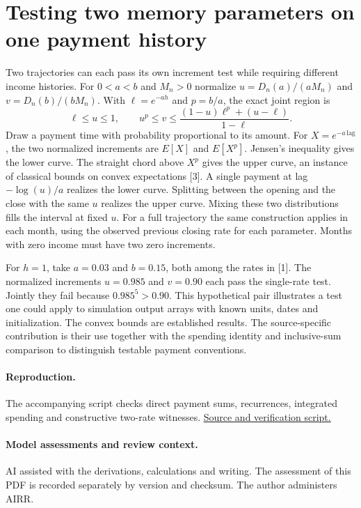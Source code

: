 \documentclass[11pt]{article}
\begin{document}
\section{Testing two memory parameters on one payment history}
Two trajectories can each pass its own increment test while requiring different income histories. For $0<a<b$ and $M_n>0$ normalize $u=D_n(a)/(aM_n)$ and $v=D_n(b)/(bM_n)$. With $\ell=e^{-ah}$ and $p=b/a$, the exact joint region is
\[
 \ell\le u\le1,\qquad u^p\le v\le
 \frac{(1-u)\ell^p+(u-\ell)}{1-\ell}.
\]
Draw a payment time with probability proportional to its amount. For $X=e^{-a\,\mathrm{lag}}$, the two normalized increments are $E[X]$ and $E[X^p]$. Jensen's inequality gives the lower curve. The straight chord above $X^p$ gives the upper curve, an instance of classical bounds on convex expectations [3]. A single payment at lag $-\log(u)/a$ realizes the lower curve. Splitting between the opening and the close with the same $u$ realizes the upper curve. Mixing these two distributions fills the interval at fixed $u$. For a full trajectory the same construction applies in each month, using the observed previous closing rate for each parameter. Months with zero income must have two zero increments.

For $h=1$, take $a=0.03$ and $b=0.15$, both among the rates in [1]. The normalized increments $u=0.985$ and $v=0.90$ each pass the single-rate test. Jointly they fail because $0.985^5>0.90$. This hypothetical pair illustrates a test one could apply to simulation output arrays with known units, dates and initialization. The convex bounds are established results. The source-specific contribution is their use together with the spending identity and inclusive-sum comparison to distinguish testable payment conventions.

\paragraph{Reproduction.} The accompanying script checks direct payment sums, recurrences, integrated spending and constructive two-rate witnesses. \href{https://github.com/lluiseriksson/THE-ERIKSSON-PROGRAMME/tree/codex/consumo-intrames-20261120/audits/intramonth-consumption}{Source and verification script.}

\paragraph{Model assessments and review context.} AI assisted with the derivations, calculations and writing. The assessment of this PDF is recorded separately by version and checksum. The author administers AIRR.
\end{document}

